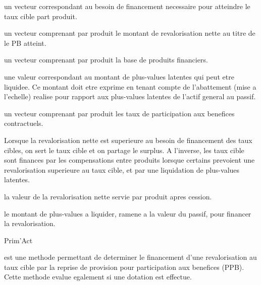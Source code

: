 \documentclass[a4paper]{book}
\begin{document}
\begin{Arguments}
\begin{ldescription}
\item[\code{bes\_cible}] un vecteur  correspondant au besoin de financement necessaire pour atteindre
le taux cible part produit.

\item[\code{rev\_stock\_nette}] un vecteur  comprenant par produit
le montant de revalorisation nette au titre de le PB atteint.

\item[\code{base\_fin}] un vecteur  comprenant par produit la base de produits financiers.

\item[\code{seuil\_pmvl}] une valeur  correspondant au montant de plus-values latentes
qui peut etre liquidee. Ce montant doit etre exprime en tenant compte de l'abattement (mise a l'echelle) realise
pour rapport aux plus-values latentes de l'actif general au passif.

\item[\code{tx\_pb}] un vecteur  comprenant par produit les taux de participation aux benefices contractuels.
\end{ldescription}
\end{Arguments}
%
\begin{Details}\relax
Lorsque la revalorisation nette est superieure au besoin de financement des taux cibles, on sert le taux cible
et on partage le surplus. A l'inverse, les taux cible sont finances par
les compensations entre produits lorsque certains prevoient une revalorisation superieure au taux cible, et
par une liquidation de plus-values latentes.
\end{Details}
%
\begin{Value}
 la valeur de la revalorisation nette servie par produit apres cession.

 le montant de plus-values a liquider, ramene a la valeur du passif, pour financer
la revalorisation.
\end{Value}
%
\begin{Author}\relax
Prim'Act
\end{Author}
%
\begin{Description}\relax
{} est une methode permettant de
determiner le financement d'une revalorisation au taux cible par la reprise de provision pour participation
aux benefices (PPB). Cette methode evalue egalement si une dotation est effectue.
\end{Description}
\end{document}
